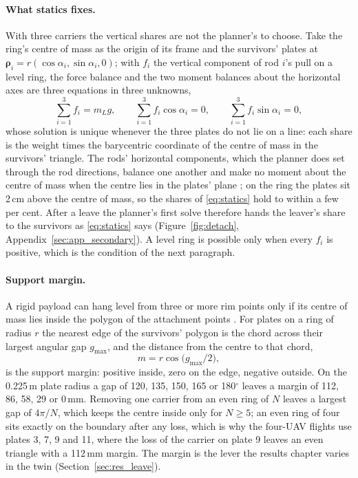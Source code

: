 \paragraph{What statics fixes.} With three carriers the vertical shares are not the planner's to choose. Take the
ring's centre of mass as the origin of its frame and the survivors' plates at $\boldsymbol{\rho}_i = r(\cos\alpha_i,
\sin\alpha_i, 0)$; with $f_i$ the vertical component of rod $i$'s pull on a level ring, the force balance and the
two moment balances about the horizontal axes are three equations in three unknowns,
\begin{equation}
    \sum_{i=1}^{3} f_i = m_L g, \qquad \sum_{i=1}^{3} f_i \cos\alpha_i = 0, \qquad \sum_{i=1}^{3} f_i \sin\alpha_i = 0,
    \label{eq:statics}
\end{equation}
whose solution is unique whenever the three plates do not lie on a line: each share is the weight times the
barycentric coordinate of the centre of mass in the survivors' triangle. The rods' horizontal components, which the
planner does set through the rod directions, balance one another and make no moment about the centre of mass when
the centre lies in the plates' plane \cite{michael2011cooperative, tognon2018internal}; on the
ring the plates sit 2\,cm above the centre of mass, so the shares of \eqref{eq:statics} hold to within a few per
cent. After a leave the planner's first solve therefore hands the leaver's share to the survivors as
\eqref{eq:statics} says (Figure~\ref{fig:detach}, Appendix~\ref{sec:app_secondary}). A level ring is possible only when every $f_i$ is positive, which
is the condition of the next paragraph.

\paragraph{Support margin.} A rigid payload can hang level from three or more rim points only if its centre of mass
lies inside the polygon of the attachment points \cite{michael2011cooperative}. For plates on a ring of radius $r$
the nearest edge of the survivors' polygon is the chord across their largest angular gap $g_{\max}$, and the
distance from the centre to that chord,
\begin{equation}
    m = r \cos\!\big(g_{\max}/2\big),
    \label{eq:margin}
\end{equation}
is the support margin: positive inside, zero on the edge, negative outside. On the 0.225\,m plate radius a gap of
120, 135, 150, 165 or 180$^\circ$ leaves a margin of 112, 86, 58, 29 or 0\,mm. Removing one carrier from an even
ring of $N$ leaves a largest gap of $4\pi/N$, which keeps the centre inside only for $N \ge 5$; an even ring of
four sits exactly on the boundary after any loss, which is why the four-UAV flights use plates 3, 7, 9 and 11,
where the loss of the carrier on plate 9 leaves an even triangle with a 112\,mm margin. The margin is the lever the
results chapter varies in the twin (Section~\ref{sec:res_leave}).

